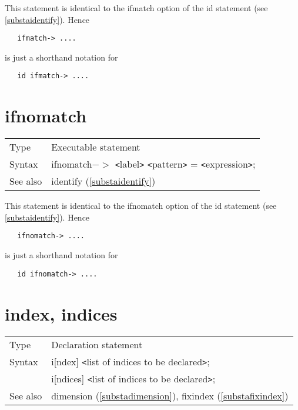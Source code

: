 \noindent This statement is identical to the ifmatch option 
of the id statement (see \ref{substaidentify}). Hence
\begin{verbatim}
   ifmatch-> ....
\end{verbatim}
is just a shorthand notation for
\begin{verbatim}
   id ifmatch-> ....
\end{verbatim}
\vspace{10mm}


\section{ifnomatch}
\label{substaifnomatch}

\noindent \begin{tabular}{ll}
Type & Executable statement\\
Syntax & ifnomatch$-\!\!>$ {\tt<}label{\tt>} {\tt<}pattern{\tt>} = {\tt<}expression{\tt>};
\\ See also & identify (\ref{substaidentify})
\end{tabular} \vspace{4mm}

\noindent This statement is identical to the ifnomatch option 
of the id statement (see \ref{substaidentify}). Hence
\begin{verbatim}
   ifnomatch-> ....
\end{verbatim}
is just a shorthand notation for
\begin{verbatim}
   id ifnomatch-> ....
\end{verbatim}
\vspace{10mm}

 
\section{index, indices}
\label{substaindex}

\noindent \begin{tabular}{ll}
Type & Declaration statement\\
Syntax & i[ndex] {\tt<}list of indices to be declared{\tt>}; \\
       & i[ndices] {\tt<}list of indices to be declared{\tt>};
\\ See also & dimension (\ref{substadimension}),
              fixindex (\ref{substafixindex})
\end{tabular} \vspace{4mm}

